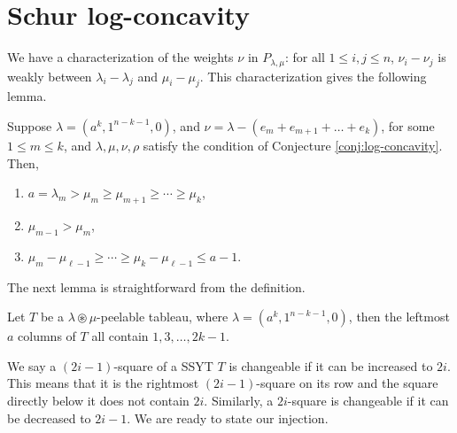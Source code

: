 \documentclass[ALCO,Unicode]{cedram}
\begin{document}
\section{Schur log-concavity}\label{sec:log-concave}

    We have a characterization of the weights $\nu$ in $P_{\lambda,\mu}$: for all $1 \leq i,j\leq n$, $\nu_i - \nu_j$ is weakly between $\lambda_i -\lambda_j$ and $\mu_i - \mu_j$. This characterization gives the following lemma.

    \begin{lemma}\label{lem:parapiped-condition}
        Suppose $\lambda = (a^k,1^{n-k-1},0)$, and $\nu = \lambda - (e_m + e_{m+1}+\ldots+e_k)$, for some $1\leq m\leq k$, and $\lambda,\mu,\nu,\rho$ satisfy the condition of Conjecture \ref{conj:log-concavity}. Then,

        \begin{enumerate}
            \item[(i)] $a = \lambda_m > \mu_m \geq \mu_{m+1} \geq \cdots \geq \mu_{k}$,
            \item[(ii)] $\mu_{m-1} > \mu_m$,
            \item[(iii)] $\mu_m - \mu_{\ell-1} \geq \cdots \geq \mu_k - \mu_{\ell-1} \leq a-1$.
        \end{enumerate}
    \end{lemma}

    The next lemma is straightforward from the definition.

    \begin{lemma}\label{lem:all-col}
        Let $T$ be a $\lambda\circledast\mu$-peelable tableau, where $\lambda = (a^k,1^{n-k-1},0)$, then the leftmost $a$ columns of $T$ all contain $1,3,\ldots,2k-1$.
    \end{lemma}

    We say a $(2i-1)$-square of a SSYT $T$ is changeable if it can be increased to $2i$. This means that it is the rightmost $(2i-1)$-square on its row and the square directly below it does not contain $2i$. Similarly, a $2i$-square is changeable if it can be decreased to $2i-1$. We are ready to state our injection.
\end{document}
